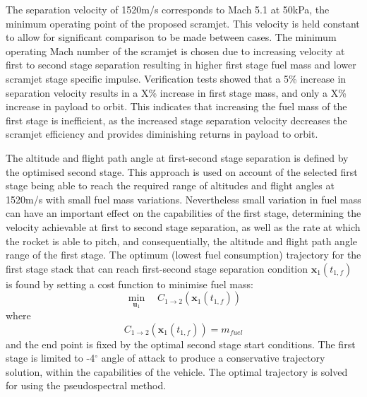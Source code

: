 \documentclass[]{aiaa-tc}
\begin{document}
The separation velocity of 1520m/s corresponds to Mach 5.1 at 50kPa, the minimum operating point of the proposed scramjet\cite{Preller2017}. This velocity is held constant to allow for significant comparison to be made between cases.   The minimum operating Mach number of the scramjet is chosen due to increasing velocity at first to second stage separation resulting in higher first stage fuel mass and lower scramjet stage specific impulse. Verification tests showed that a 5\% increase in separation velocity results in a X\% increase in first stage mass, and only a X\% increase in payload to orbit. This indicates that increasing the fuel mass of the first stage is inefficient, as the increased stage separation velocity decreases the scramjet efficiency and provides diminishing returns in payload to orbit.  

The altitude and flight path angle at first-second stage separation is defined by the optimised second stage. This approach is used on account of the selected first stage being able to reach the required range of altitudes and flight angles at 1520m/s  with small fuel mass variations. 
Nevertheless small variation in fuel mass can have an important effect on the capabilities of the first stage, determining the velocity achievable at first to second stage separation, as well as the rate at which the rocket is able to pitch, and consequentially, the altitude and flight path angle range of the first stage.
 The optimum (lowest fuel consumption) trajectory for the first stage stack that can reach first-second stage separation condition $\textbf{x}_1(t_{1,f})$ is found by setting a cost function to minimise fuel mass:
\begin{equation}
\min\limits_{\textbf{u}_1} \quad  C_{1 \rightarrow 2}(\textbf{x}_1(t_{1,f}))
\end{equation}
where
\begin{equation}
C_{1 \rightarrow 2}(\textbf{x}_1(t_{1,f})) = m_{fuel}
\end{equation}
and the end point is fixed by the optimal second stage start conditions. The first stage is limited to -4$^\circ$ angle of attack to produce a conservative trajectory solution, within the capabilities of the vehicle. The optimal trajectory is solved for using the pseudospectral method.
\end{document}
